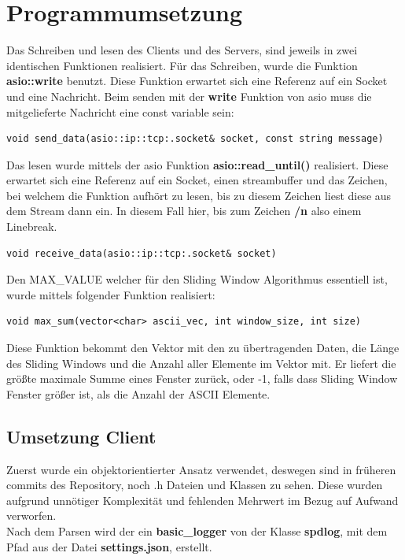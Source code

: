 \documentclass{article}
\begin{document}
\section{Programmumsetzung}

Das Schreiben und lesen des Clients und des Servers, sind jeweils in zwei identischen Funktionen realisiert. Für das Schreiben, wurde die Funktion \textbf{asio::write} benutzt. Diese Funktion erwartet sich eine Referenz auf ein Socket und eine Nachricht. Beim senden mit der \textbf{write} Funktion von asio muss die mitgelieferte Nachricht eine const variable sein:

\begin{lstlisting}
void send_data(asio::ip::tcp:.socket& socket, const string message)
\end{lstlisting}

Das lesen wurde mittels der asio Funktion \textbf{asio::read\_until()} realisiert. Diese erwartet sich eine Referenz auf ein Socket, einen streambuffer und das Zeichen, bei welchem die Funktion aufhört zu lesen, bis zu diesem Zeichen liest diese aus dem Stream dann ein. In diesem Fall hier, bis zum Zeichen \textbf{/n} also einem Linebreak.

\begin{lstlisting}
void receive_data(asio::ip::tcp:.socket& socket)
\end{lstlisting}

Den MAX\_VALUE welcher für den Sliding Window Algorithmus essentiell ist, wurde mittels folgender Funktion realisiert:
\begin{lstlisting}
void max_sum(vector<char> ascii_vec, int window_size, int size)
\end{lstlisting}

Diese Funktion bekommt den Vektor mit den zu übertragenden Daten, die Länge des Sliding Windows und die Anzahl aller Elemente im Vektor mit. Er liefert die größte maximale Summe eines Fenster zurück, oder -1, falls dass Sliding Window Fenster größer ist, als die Anzahl der ASCII Elemente.

\subsection{Umsetzung Client}
Zuerst wurde ein objektorientierter Ansatz verwendet, deswegen sind in früheren commits des Repository, noch .h Dateien und Klassen
zu sehen. Diese wurden aufgrund unnötiger Komplexität und fehlenden Mehrwert im Bezug auf Aufwand verworfen.\\
Nach dem Parsen wird der ein \textbf{basic\_logger} von der Klasse \textbf{spdlog}, mit dem Pfad aus der Datei \textbf{settings.json}, erstellt.\newline
\end{document}
